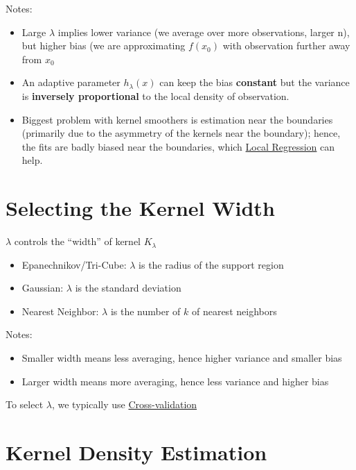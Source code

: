 \documentclass[
]{book}
\begin{document}
Notes:

\begin{itemize}
\item
  Large \(\lambda\) implies lower variance (we average over more observations, larger n), but higher bias (we are approximating \(f(x_0)\) with observation further away from \(x_0\)
\item
  An adaptive parameter \(h_\lambda(x)\) can keep the bias \textbf{constant} but the variance is \textbf{inversely proportional} to the local density of observation.
\item
  Biggest problem with kernel smoothers is estimation near the boundaries (primarily due to the asymmetry of the kernels near the boundary); hence, the fits are badly biased near the boundaries, which \protect\hyperlink{local-regression}{Local Regression} can help.
\end{itemize}

\hypertarget{selecting-the-kernel-width}{%
\section{Selecting the Kernel Width}\label{selecting-the-kernel-width}}

\(\lambda\) controls the ``width'' of kernel \(K_\lambda\)

\begin{itemize}
\item
  Epanechnikov/Tri-Cube: \(\lambda\) is the radius of the support region
\item
  Gaussian: \(\lambda\) is the standard deviation
\item
  Nearest Neighbor: \(\lambda\) is the number of \(k\) of nearest neighbors
\end{itemize}

Notes:

\begin{itemize}
\item
  Smaller width means less averaging, hence higher variance and smaller bias
\item
  Larger width means more averaging, hence less variance and higher bias
\end{itemize}

To select \(\lambda\), we typically use \protect\hyperlink{cross-validation}{Cross-validation}

\hypertarget{kernel-density-estimation}{%
\section{Kernel Density Estimation}\label{kernel-density-estimation}}
\end{document}
